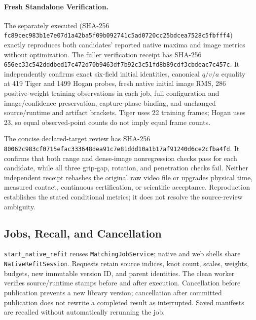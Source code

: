 \documentclass[11pt,letterpaper]{article}
\newcommand{\code}[1]{\nolinkurl{#1}}
\newcommand{\hash}[1]{{\footnotesize\nolinkurl{#1}}}
\begin{document}
\paragraph{Fresh Standalone Verification.}
The separately executed 
(SHA-256
\hash{fc89cec983b1e7e07d1a42ba5f09b092741c5ad0720cc25bdcea7528c5fbfff4})
exactly reproduces both candidates' reported native maxima and image metrics
without optimization. The fuller verification receipt
 has SHA-256
\hash{656ec33c542dddbed17c472d70b9463df7b92c3c51fd8b89cdf3cbdeac7c457c}.
It independently confirms exact six-field initial identities, canonical
$q/v/a$ equality at 419 Tiger and 1499 Hogan probes, fresh native initial image
RMS, 286 positive-weight training observations in each job, full configuration
and image/confidence preservation, capture-phase binding, and unchanged
source/runtime and artifact brackets. Tiger uses 22 training frames; Hogan
uses 23, so equal observed-point counts do not imply equal frame counts.

The concise declared-target review has SHA-256
\hash{80062c983cf0715efac333648dea91c7e81ddd10a1b17af91240d6ce2cfba4fd}.
It confirms that both range and dense-image nonregression checks pass for each
candidate, while all three grip-gap, rotation, and penetration checks fail.
Neither independent receipt rehashes the original raw video file or upgrades
physical time, measured contact, continuous certification, or scientific
acceptance. Reproduction establishes the stated conditional metrics; it does
not resolve the source-review ambiguity.

\subsection{Jobs, Recall, and Cancellation}
\code{start_native_refit} reuses \code{MatchingJobService}; native and web shells
share \code{NativeRefitSession}. Requests retain source indices, knot count,
scales, weights, budgets, new immutable version ID, and parent identities.
The clean worker verifies source/runtime stamps before and after execution.
Cancellation before publication prevents a new library version; cancellation
after committed publication does not rewrite a completed result as interrupted.
Saved manifests are recalled without automatically rerunning the job.
\end{document}
